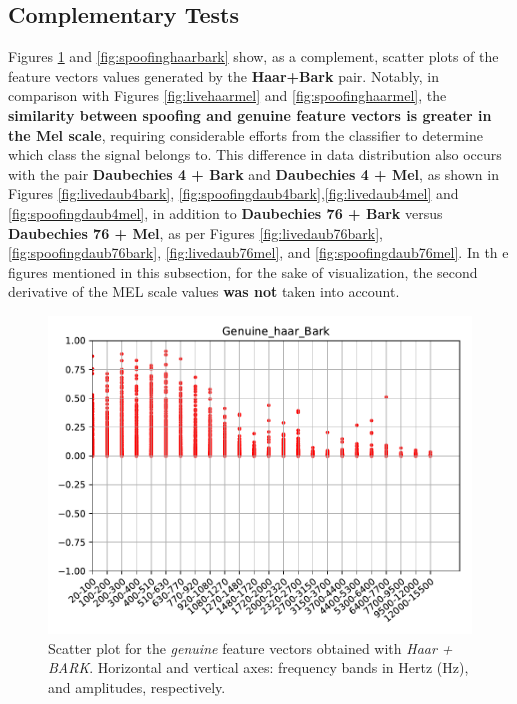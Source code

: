 	\subsection{Complementary Tests}
		\par Figures \ref{fig:livehaarbark} and \ref{fig:spoofinghaarbark} show, as a complement, scatter plots of the feature vectors values generated by the \textbf{Haar+Bark} pair. Notably, in comparison with Figures \ref{fig:livehaarmel} and \ref{fig:spoofinghaarmel}, the \textbf{similarity between spoofing and genuine feature vectors is greater in the Mel scale}, requiring considerable efforts from the classifier to determine which class the signal belongs to. This difference in data distribution also occurs with the pair \textbf{Daubechies 4 + Bark} and \textbf{Daubechies 4 + Mel}, as shown in Figures \ref{fig:livedaub4bark}, \ref{fig:spoofingdaub4bark},\ref{fig:livedaub4mel} and \ref{fig:spoofingdaub4mel}, in addition to \textbf{Daubechies 76 + Bark} versus \textbf{Daubechies 76 + Mel}, as per Figures \ref{fig:livedaub76bark}, \ref{fig:spoofingdaub76bark}, \ref{fig:livedaub76mel}, and \ref{fig:spoofingdaub76mel}. In th e figures mentioned in this subsection, for the sake of visualization, the second derivative of the MEL scale values \textbf{was not} taken into account.
		\\
		\begin{figure}
			\centering
			\includegraphics[scale=.7]{images/results/barkVersusMel/Genuine_haar_Bark.pdf}
			\caption{Scatter plot for the \textit{genuine} feature vectors obtained with \textit{Haar + BARK}. Horizontal and vertical axes: frequency bands in Hertz (Hz), and amplitudes, respectively.}
			\label{fig:livehaarbark}
		\end{figure}
